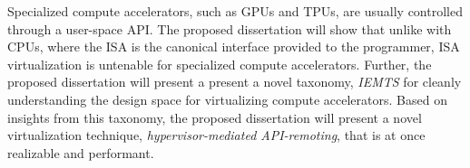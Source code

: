 Specialized compute accelerators, such as GPUs and TPUs, are usually
controlled through a user-space API.
The proposed dissertation will show that unlike with CPUs, where the ISA is
the canonical interface provided to the programmer, ISA virtualization is
untenable for specialized compute accelerators. Further, the proposed
dissertation will present a present a novel taxonomy, \emph{IEMTS} for cleanly
understanding the design space for virtualizing compute accelerators.
Based on insights from this taxonomy, the proposed dissertation will
present a novel virtualization technique, \emph{hypervisor-mediated
API-remoting}, that is at once realizable and performant.

\clearpage
